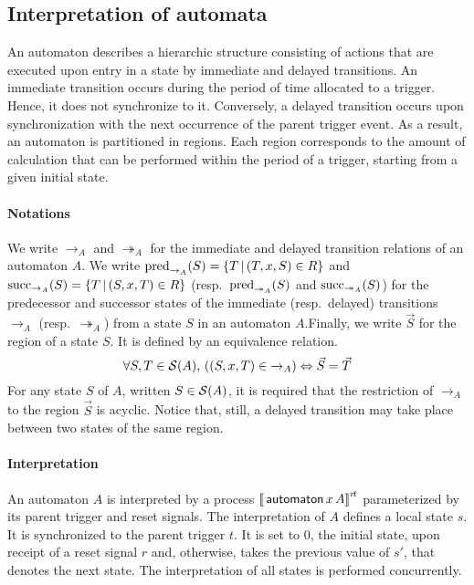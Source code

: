 \documentclass[copyright,creativecommons]{eptcs}
\renewcommand{\S}{{\cal{S}}}
\newcommand{\op}[1]{{\sf #1}}
\newcommand{\kw}[1]{{{\,\op{#1}\,}}}
\newcommand{\Pred}{{\rm{pred}}}
\newcommand{\Succ}{{\rm{succ}}}
\newcommand{\ra}{\rightarrow}
\newcommand{\Sq}[1]{{[\![{#1}]\!]}}
\renewcommand{\:}{{:}}
\newcommand{\st}{{s.t.}}
\newcommand{\rra}{\twoheadrightarrow}
\newcommand{\Auto}{{\kw{automaton}}}
\newcommand{\dt}[1]{{\rra_{#1}}}
\renewcommand{\st}[1]{{\ra_{#1}}}
\begin{document}
\subsection{Interpretation of automata}

An automaton describes a hierarchic structure consisting of actions that are executed upon entry in a state by immediate and delayed transitions. An immediate transition occurs during the period of time allocated to a trigger. Hence, it does not synchronize to it. Conversely, a delayed transition occurs upon synchronization with the next occurrence of the parent trigger event. As a result, an automaton is partitioned in regions.  Each region corresponds to the amount of calculation that can be performed within the period of a trigger, starting from a given initial state.

\paragraph*{Notations}

We write $\st A$ and $\dt{A}$ for the immediate and delayed transition relations of an automaton $A$.  We write $\Pred_{\st A}(S)=\{T\,|\,(T,x,S)\in R\}$ and $\Succ_{\st A}(S)=\{T\,|\,(S,x,T)\in R\}$ (resp.\ $\Pred_{\dt A}(S)$ and $\Succ_{\dt A}(S)$) for the predecessor and successor states of the immediate (resp.\ delayed) transitions $\st A$ (resp.\ $\dt{A}$) from a state $S$ in an automaton $A$.Finally, we write $\vec S$ for the region of a state $S$. It is defined by an equivalence relation.
\[
\forall S,T\in\S(A),\,\left((S,x,T)\in\st A\right)\Leftrightarrow \vec S = \vec T
\]
For any state $S$ of $A$, written $S\in\S(A)$, it is required that the restriction of $\st A$ to the region $\vec S$ is acyclic. Notice that, still, a delayed transition may take place between two states of the same region.

\paragraph*{Interpretation}

An automaton $A$ is interpreted by a process $\Sq{\Auto x\,A}^{r\!t}$ parameterized by its parent trigger and reset signals. The interpretation of $A$ defines a local state $s$. It is synchronized to the parent trigger $t$.  It is set to $0$, the initial state, upon receipt of a reset signal $r$ and, otherwise, takes the previous value of $s'$, that denotes the next state. The interpretation of all states is performed concurrently.
\end{document}

